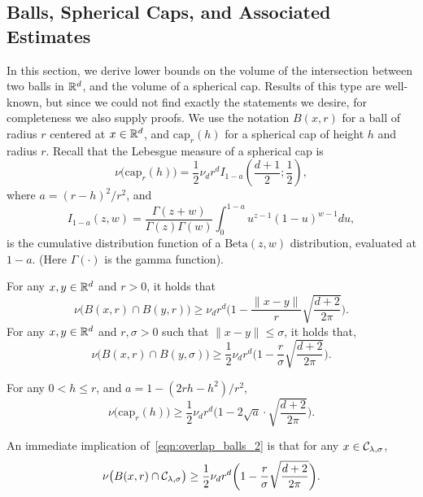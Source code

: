 \subsection{Balls, Spherical Caps, and Associated Estimates}
\label{subsec:spherical_caps}
In this section, we derive lower bounds on the volume of the intersection between two balls in $\mathbb{R}^d$, and the volume of a spherical cap. Results of this type are well-known, but since we could not find exactly the statements we desire, for completeness we also supply proofs. We use the notation $B(x,r)$ for a ball of radius $r$ centered at $x \in \mathbb{R}^d$, and $\mathrm{cap}_{r}(h)$ for a spherical cap of height $h$ and radius $r$. Recall that the Lebesgue measure of a spherical cap is
\begin{equation*}
\nu\bigl(\mathrm{cap}_r(h)\bigr) = \frac{1}{2} \nu_d r^d I_{1 - a}\left(\frac{d + 1}{2}; \frac{1}{2}\right),
\end{equation*}
where $a = (r - h)^2/r^2$, and
\begin{equation*}
I_{1 - a}(z,w) = \frac{\Gamma(z + w)}{\Gamma(z) \Gamma(w)} \int_{0}^{1 - a} u^{z - 1} (1 - u)^{w - 1} du,
\end{equation*}
is the cumulative distribution function of a $\mathrm{Beta}(z,w)$ distribution, evaluated at $1 - a$. (Here $\Gamma(\cdot)$ is the gamma function).
\begin{lemma}
	\label{lem:overlap_balls}
	For any $x,y \in \mathbb{R}^d$ and $r > 0$, it holds that
	\begin{equation}
	\label{eqn:overlap_balls_1}
	\nu\bigl(B(x,r) \cap B(y,r)\bigr) \geq \nu_d r^d\biggl(1 - \frac{\|x - y\|}{r} \sqrt{\frac{d + 2}{2\pi}}\biggr).
	\end{equation}
	For any $x,y \in \mathbb{R}^d$ and $r,\sigma > 0$ such that $\|x - y\| \leq \sigma$, it holds that,
	\begin{equation}
	\label{eqn:overlap_balls_2}
	\nu\bigl(B(x,r) \cap B(y,\sigma)\bigr) \geq \frac{1}{2} \nu_d r^d\biggl(1 - \frac{r}{\sigma}\sqrt{\frac{d + 2}{2\pi}}\biggr).
	\end{equation}
\end{lemma}
\begin{lemma}
	\label{lem:volume_of_spherical_cap}
	For any $0 < h \leq r$, and $a = 1 - (2 r h - h^2)/r^2$,
	\begin{equation*}
	\nu\bigl(\mathrm{cap}_r(h)\bigr) \geq \frac{1}{2}\nu_dr^d\biggl(1 - 2\sqrt{a} \cdot \sqrt{\frac{d + 2}{2\pi}}\biggr).
	\end{equation*}
\end{lemma}
An immediate implication of~\eqref{eqn:overlap_balls_2} is that for any $x \in \mathcal{C}_{\lambda,\sigma}$,
\begin{equation}
\label{eqn:uniform_local_conductance}
\nu\bigl(B(x,r) \cap \mathcal{C}_{\lambda,\sigma}\bigr) \geq \frac{1}{2} \nu_d r^d\biggl(1 - \frac{r}{\sigma}\sqrt{\frac{d + 2}{2\pi}}\biggr).
\end{equation}  
